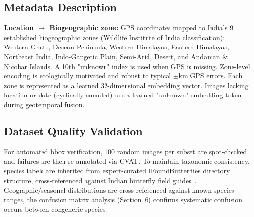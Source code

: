 \documentclass[runningheads]{llncs}
\begin{document}
\subsection{Metadata Description}
\textbf{Location $\rightarrow$ Biogeographic zone:} GPS coordinates mapped to India's 9 established biogeographic zones (Wildlife Institute of India classification): Western Ghats, Deccan Peninsula, Western Himalayas, Eastern Himalayas, Northeast India, Indo-Gangetic Plain, Semi-Arid, Desert, and Andaman \& Nicobar Islands. A 10th "unknown" index is used when GPS is missing. Zone-level encoding is ecologically motivated and robust to typical $\pm$km GPS errors. Each zone is represented as a learned 32-dimensional embedding vector.
Images lacking location or date (cyclically encoded) use a learned "unknown" embedding token during geotemporal fusion.

\subsection{Dataset Quality Validation}
For automated bbox verification, 100 random images per subset are spot-checked and failures are then re-annotated via CVAT. To maintain taxonomic consistency, species labels are inherited from expert-curated \href{https://www.ifoundbutterflies.org}{IFoundButterflies} directory structure, cross-referenced against Indian butterfly field guides~\cite{kehimkar2016butterflies}. Geographic/seasonal distributions are cross-referenced against known species ranges, the confusion matrix analysis (Section~6) confirms systematic confusion occurs between congeneric species.
\end{document}
